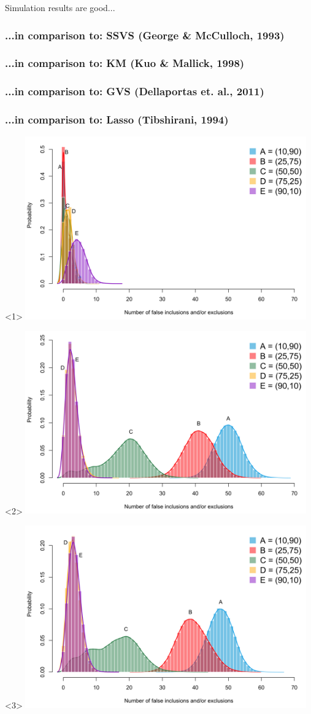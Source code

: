 \documentclass{beamer}\usepackage[]{graphicx}\usepackage[]{color}
\begin{document}
\begin{frame}{Simulation results are good...}
	\frametitle<2>{...in comparison to: SSVS (George \& McCulloch, 1993)}
	\frametitle<3>{...in comparison to: KM (Kuo \& Mallick, 1998)}
	\frametitle<4>{...in comparison to: GVS (Dellaportas et. al., 2011)}
	\frametitle<5>{...in comparison to: Lasso (Tibshirani, 1994)}
	\vspace{-1mm}
	\begin{onlyenv}
		\includegraphics[height=3.1in]{figure/sim5}
	\end{onlyenv}
	\begin{onlyenv}
		\includegraphics[height=3.1in]{figure/sim1}
	\end{onlyenv}
	\begin{onlyenv}
		\includegraphics[height=3.1in]{figure/sim2}

\end{onlyenv}
\end{frame}
\end{document}
